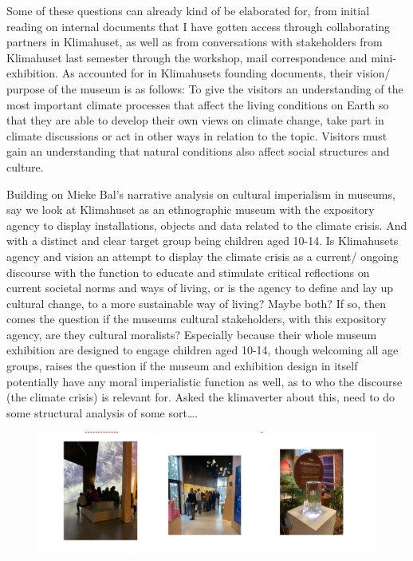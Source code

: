 Some of these questions can already kind of be elaborated for, from initial reading on internal documents that I have gotten access through collaborating partners in Klimahuset, as well as from conversations with stakeholders from Klimahuset last semester through the workshop, mail correspondence and mini-exhibition. As accounted for in Klimahusets founding documents, their vision/ purpose of the museum is as follows:
To give the visitors an understanding of the most important climate processes that affect the living conditions on Earth so that they are able to develop their own views on climate change, take part in climate discussions or act in other ways in relation to the topic.
Visitors must gain an understanding that natural conditions also affect social structures and culture.
	
Building on Mieke Bal’s narrative analysis on cultural imperialism in museums, say we look at Klimahuset as an ethnographic museum with the expository agency to display installations, objects and data related to the climate crisis. And with a distinct and clear target group being children aged 10-14. Is Klimahusets agency and vision an attempt to display the climate crisis as a current/ ongoing discourse with the function to educate and stimulate critical reflections on current societal norms and ways of living, or is the agency to define and lay up cultural change, to a more sustainable way of living? Maybe both? If so, then comes the question if the museums cultural stakeholders, with this expository agency, are they cultural moralists? Especially because their whole museum exhibition are designed to engage children aged 10-14, though welcoming all age groups, raises the question if the museum and exhibition design in itself potentially have any moral imperialistic function as well, as to who the discourse (the climate crisis) is relevant for. 
Asked the klimaverter about  this, need to do some structural analysis of some sort….

\begin{figure}[H]
\includegraphics[width=13cm]{pictures/elever_i_klimahuset.png}
\centering 
\end{figure}

